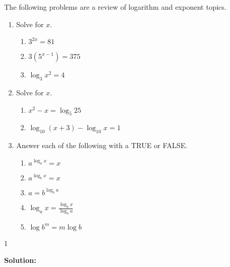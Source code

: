 \documentclass[9pt]{article}
\def\solutions{1}
\begin{document}
\item The following problems are a review of logarithm and exponent topics.

\begin{enumerate}

\item Solve for $x$.

	\begin{enumerate}
	\item $3^{2x} =  81$
	\item $3(5^{x-1}) = 375 $
	\item $ \log_3 x^2  = 4  $
	\end{enumerate}


\item Solve for $x$.

	\begin{enumerate}
	\item $x^2 - x = \log_5 25 $
	\item $ \log_{10} (x+3) - \log_{10} x = 1 $
	\end{enumerate}

\item Answer each of the following with a TRUE or FALSE. 

	\begin{enumerate}
	\item $ a^{\log_a x} = x $
	\item $ a^{\log_b x} = x $
	\item $ a = b^{\log_b a} $
	\item $\log_a x = \frac{\log_b x}{\log_b a} $
	\item $\log b^m = m \log b $
	\end{enumerate}
	
\end{enumerate}

  \if\solutions1
  \vspace{2mm}
  
  \textbf{Solution:}   \\
\end{document}
